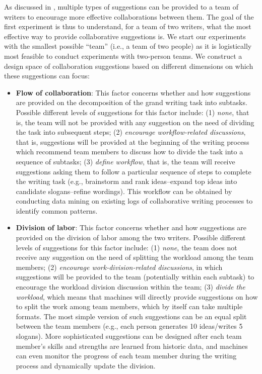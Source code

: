 As discussed in , multiple types of suggestions can be provided to a team of writers to encourage more effective collaborations between them. The goal of the first experiment is thus to understand, for a team of two writers, what the most effective way to provide collaborative suggestions is. We start our experiments with the smallest possible ``team'' (i.e., a team of two people) as it is logistically most feasible to conduct experiments with two-person teams. We construct a design space of collaboration suggestions based on different dimensions on which these suggestions can focus:
\begin{itemize}
\item {\bf Flow of collaboration}: This factor concerns whether and how suggestions are provided on the decomposition of the grand writing task into subtasks. Possible different levels of suggestions for this factor include: (1) {\em none}, that is, the team will not be provided with any suggestion on the need of dividing the task into subsequent steps; (2) {\em encourage workflow-related discussions}, that is, suggestions will be provided at the beginning of the writing process which recommend team members to discuss how to divide the task into a sequence of subtasks; (3) {\em define workflow}, that is, the team will receive suggestions asking them to follow a particular sequence of steps to complete the writing task (e.g., brainstorm and rank ideas--expand top ideas into candidate slogans--refine wordings). This workflow can be obtained by conducting data mining on existing logs of collaborative writing processes to identify common patterns.  
\item {\bf Division of labor}: This factor concerns whether and how suggestions are provided on the division of labor among the two writers. Possible different levels of suggestions for this factor include: (1) {\em none}, the team does not receive any suggestion on the need of splitting the workload among the team members; (2) {\em encourage work-division-related discussions}, in which suggestions will be provided to the team (potentially within each subtask) to encourage the workload division discussion within the team; (3) {\em divide the workload}, which means that machines will directly provide suggestions on how to split the work among team members, which by itself can take multiple formats. The most simple version of such suggestions can be an equal split between the team members (e.g., each person generates 10 ideas/writes 5 slogans). More sophisticated suggestions can be designed after each team member's skills and strengths are learned from historic data, and machines can even monitor the progress of each team member during the writing process and dynamically update the division.

\end{itemize}
